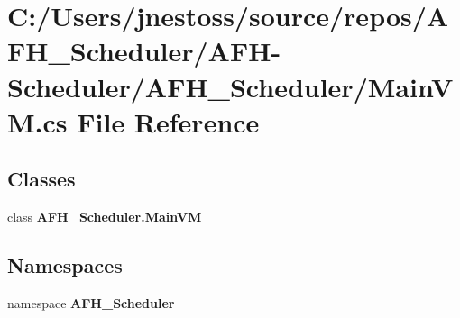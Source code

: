 \section{C\+:/\+Users/jnestoss/source/repos/\+A\+F\+H\+\_\+\+Scheduler/\+A\+F\+H-\/\+Scheduler/\+A\+F\+H\+\_\+\+Scheduler/\+Main\+VM.cs File Reference}
\label{_main_v_m_8cs}
\subsection*{Classes}
\begin{DoxyCompactItemize}
\item 
class \textbf{ A\+F\+H\+\_\+\+Scheduler.\+Main\+VM}
\end{DoxyCompactItemize}
\subsection*{Namespaces}
\begin{DoxyCompactItemize}
\item 
namespace \textbf{ A\+F\+H\+\_\+\+Scheduler}
\end{DoxyCompactItemize}
